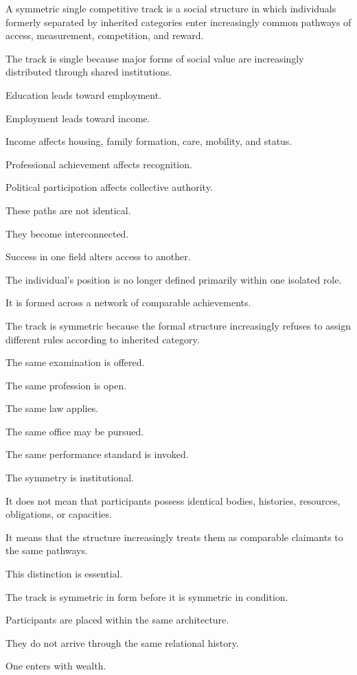 A symmetric single competitive track is a social structure in which individuals formerly separated by inherited categories enter increasingly common pathways of access, measurement, competition, and reward.

The track is single because major forms of social value are increasingly distributed through shared institutions.

Education leads toward employment.

Employment leads toward income.

Income affects housing, family formation, care, mobility, and status.

Professional achievement affects recognition.

Political participation affects collective authority.

These paths are not identical.

They become interconnected.

Success in one field alters access to another.

The individual’s position is no longer defined primarily within one isolated role.

It is formed across a network of comparable achievements.

The track is symmetric because the formal structure increasingly refuses to assign different rules according to inherited category.

The same examination is offered.

The same profession is open.

The same law applies.

The same office may be pursued.

The same performance standard is invoked.

The symmetry is institutional.

It does not mean that participants possess identical bodies, histories, resources, obligations, or capacities.

It means that the structure increasingly treats them as comparable claimants to the same pathways.

This distinction is essential.

The track is symmetric in form before it is symmetric in condition.

Participants are placed within the same architecture.

They do not arrive through the same relational history.

One enters with wealth.

